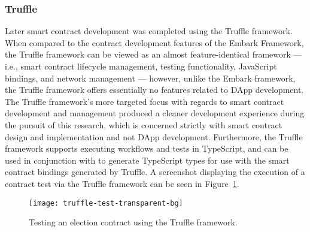 \subsubsection{Truffle}
Later smart contract development was completed using the Truffle framework. When
compared to the contract development features of the Embark Framework, the
Truffle framework can be viewed as an almost feature-identical framework ---
i.e., smart contract lifecycle management, testing functionality, JavaScript
bindings, and network management --- however, unlike the Embark framework, the
Truffle framework offers essentially no features related to DApp development.
The Truffle framework's more targeted focus with regards to smart contract
development and management produced a cleaner development experience during the
pursuit of this research, which is concerned strictly with smart contract design
and implementation and not DApp development. Furthermore, the Truffle framework
supports executing workflows and tests in TypeScript, and can be used in
conjunction with  to generate TypeScript types for use with the
smart contract bindings generated by Truffle. A screenshot displaying the
execution of a contract test via the Truffle framework can be seen in
Figure~\ref{fig:truffle-test}.

\begin{figure}[H]
  \centering
  \texttt{[image: truffle-test-transparent-bg]}
  \caption{Testing an election contract using the Truffle framework.}\label{fig:truffle-test}
\end{figure}

